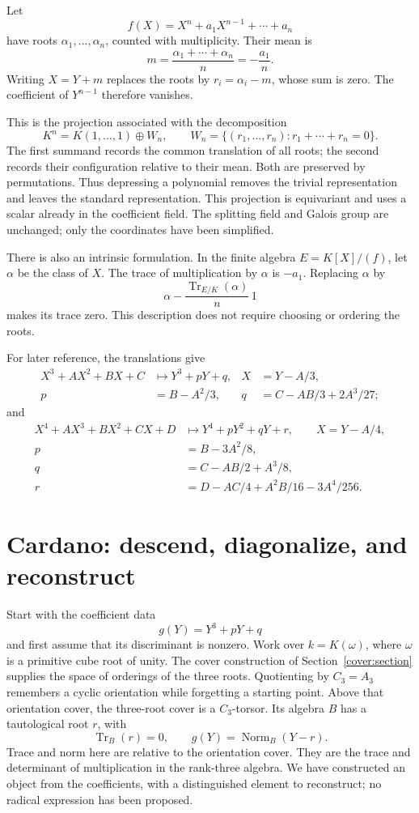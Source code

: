 \documentclass[11pt]{article}
\theoremstyle{remark}
\newcommand{\Tr}{\operatorname{Tr}}
\begin{document}
Let
\[
f(X)=X^n+a_1X^{n-1}+\cdots+a_n
\]
have roots \(\alpha_1,\ldots,\alpha_n\), counted with multiplicity. Their mean is
\[
m=\frac{\alpha_1+\cdots+\alpha_n}{n}=-\frac{a_1}{n}.
\]
Writing \(X=Y+m\) replaces the roots by \(r_i=\alpha_i-m\), whose sum is zero. The coefficient of \(Y^{n-1}\) therefore vanishes.

This is the projection associated with the decomposition
\begin{equation}
K^n=K(1,\ldots,1)\oplus W_n,
\qquad
W_n=\{(r_1,\ldots,r_n):r_1+\cdots+r_n=0\}.
\label{eq:centering}
\end{equation}
The first summand records the common translation of all roots; the second records their configuration relative to their mean. Both are preserved by permutations. Thus depressing a polynomial removes the trivial representation and leaves the standard representation. This projection is equivariant and uses a scalar already in the coefficient field. The splitting field and Galois group are unchanged; only the coordinates have been simplified.

There is also an intrinsic formulation. In the finite algebra \(E=K[X]/(f)\), let \(\alpha\) be the class of \(X\). The trace of multiplication by \(\alpha\) is \(-a_1\). Replacing \(\alpha\) by
\[
\alpha-\frac{\Tr_{E/K}(\alpha)}{n}\,1
\]
makes its trace zero. This description does not require choosing or ordering the roots.

For later reference, the translations give
\begin{align*}
X^3+AX^2+BX+C&\longmapsto Y^3+pY+q, &X&=Y-A/3,\\
p&=B-A^2/3, &q&=C-AB/3+2A^3/27;
\end{align*}
and
\begin{align*}
X^4+AX^3+BX^2+CX+D&\longmapsto Y^4+pY^2+qY+r,\qquad X=Y-A/4,\\
p&=B-3A^2/8,\\
q&=C-AB/2+A^3/8,\\
r&=D-AC/4+A^2B/16-3A^4/256.
\end{align*}

\section{Cardano: descend, diagonalize, and reconstruct}
\label{cardano:section}

Start with the coefficient data
\[
g(Y)=Y^3+pY+q
\]
and first assume that its discriminant is nonzero. Work over \(k=K(\omega)\), where \(\omega\) is a primitive cube root of unity. The cover construction of Section~\ref{cover:section} supplies the space of orderings of the three roots. Quotienting by \(C_3=A_3\) remembers a cyclic orientation while forgetting a starting point. Above that orientation cover, the three-root cover is a \(C_3\)-torsor. Its algebra \(B\) has a tautological root \(r\), with
\[
\operatorname{Tr}_{B}(r)=0,
\qquad
g(Y)=\operatorname{Norm}_{B}(Y-r).
\]
Trace and norm here are relative to the orientation cover. They are the trace and determinant of multiplication in the rank-three algebra. We have constructed an object from the coefficients, with a distinguished element to reconstruct; no radical expression has been proposed.
\end{document}
